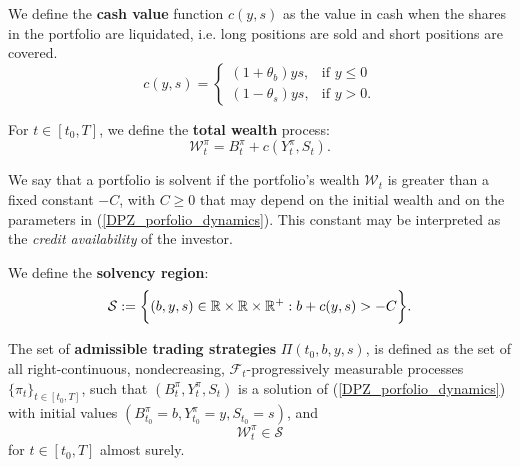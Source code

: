 

\begin{Definition}
We define the \textbf{cash value} function $c(y,s)$ as the value in cash when the shares in the portfolio are liquidated, i.e.  
long positions are sold and short positions are covered.
\begin{equation}\label{cost_function}
c(y,s) = \begin{cases} 
(1+\theta_b)ys, & \mbox{if } y\leq 0 \\ 
(1-\theta_s)ys, & \mbox{if } y>0 . 
\end{cases} 
\end{equation} 
\end{Definition}
\begin{Definition}
For $t\in [t_0,T]$, we define the \textbf{total wealth} process:
\begin{equation}\label{wealth_process}
 \mathcal{W}^{\pi}_t = B^{\pi}_t + c(Y^{\pi}_t,S_t).
\end{equation} 
\end{Definition}
We say that a portfolio is solvent if the portfolio's wealth $\mathcal{W}_t$ is greater than a fixed constant $-C$, with 
$C\geq0$ that may depend on the initial wealth and on the parameters in (\ref{DPZ_porfolio_dynamics}). 
This constant may be interpreted as the \emph{credit availability} of the investor.
\begin{Definition}
We define the \textbf{solvency region}:
\begin{equation}\label{solvency_region}
 \mathcal{S} := \biggl\{ (b,y,s) \in \mathbb{R} \times \mathbb{R} \times \mathbb{R}^+ : b + c(y,s) > -C  \biggr\}.
\end{equation} 
\end{Definition}
\begin{Definition}\label{admissible_strategies1}
The set of \textbf{admissible trading strategies} $\Pi(t_0,b,y,s)$, is defined   
as the set of all right-continuous, nondecreasing, $\mathcal{F}_t$-progressively measurable processes  
$\{\pi_t\}_{t \in [t_0,T]}$, such that $(B^\pi_t,Y^\pi_t,S_t)$ is a solution of (\ref{DPZ_porfolio_dynamics}) with initial values $(B^\pi_{t_0} = b, Y^\pi_{t_0} = y, S_{t_0} = s)$, 
and 
\begin{equation}
 \mathcal{W}^{\pi}_t \in \mathcal{S}
\end{equation}
for $t \in [t_0,T]$ almost surely.
\end{Definition}

